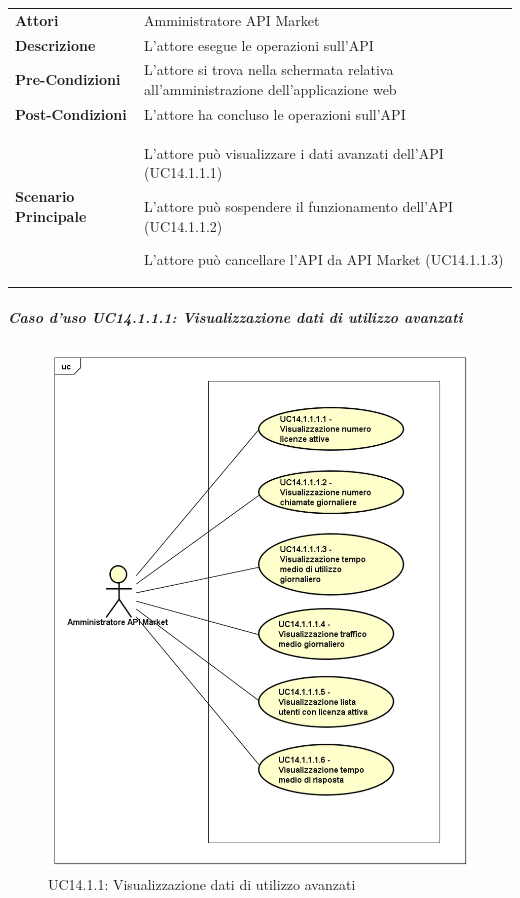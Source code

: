\begin{minipage}{\linewidth}
	\begin{tabular}{ l | p{11cm}}
		\hline
		\rowcolor{Gray}
		\multicolumn{2}{c}{UC14.1.1 - Operazioni su API} \\
		\hline
		\textbf{Attori} &  Amministratore API Market \\
		\textbf{Descrizione} & L'attore esegue le operazioni sull'API \\
		\textbf{Pre-Condizioni} & L'attore si trova nella schermata relativa all'amministrazione dell'applicazione web \\
		\textbf{Post-Condizioni} & L'attore ha concluso le operazioni sull'API \\
		\textbf{Scenario Principale} & 
		\begin{enumerate*}[label=(\arabic*.),itemjoin={\newline}]
			\item L'attore può visualizzare i dati avanzati dell'API (UC14.1.1.1)
			\item L'attore può sospendere il funzionamento dell'API (UC14.1.1.2)
			\item L'attore può cancellare l'API da API Market (UC14.1.1.3)
		\end{enumerate*}\\
	\end{tabular}
\end{minipage}

\newpage
\subparagraph{Caso d'uso UC14.1.1.1: Visualizzazione dati di utilizzo avanzati}
\label{UC14_1_1_1}
\begin{figure}[ht]
	\centering
	\includegraphics[scale=0.45]{UML/UC14_1_1_1.png}
	\caption{UC14.1.1: Visualizzazione dati di utilizzo avanzati}
\end{figure}

